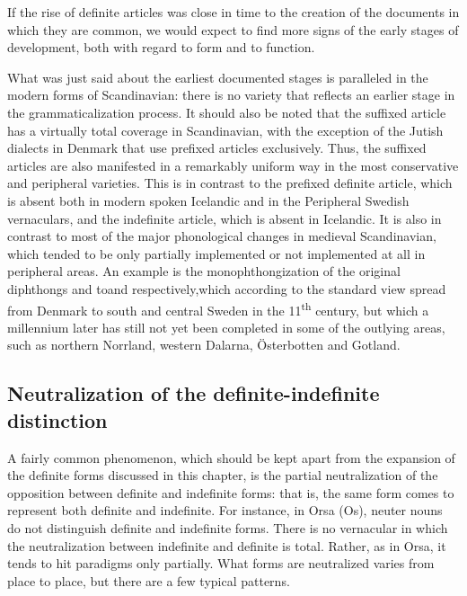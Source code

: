 \z

If the rise of definite articles was close in time to the creation of the documents in which they are common, we would expect to find more signs of the early stages of development, both with regard to form and to function.


What was just said about the earliest documented stages is paralleled in the modern forms of Scandinavian: there is no variety that reflects an earlier stage in the grammaticalization process. It should also be noted that the suffixed article has a virtually total coverage in Scandinavian, with the exception of the Jutish dialects in Denmark that use prefixed articles exclusively. Thus, the suffixed articles are also manifested in a remarkably uniform way in the most conservative and peripheral varieties. This is in contrast to the prefixed definite article, which is absent both in modern spoken Icelandic and in the Peripheral Swedish vernaculars, and the indefinite article, which is absent in Icelandic. It is also in contrast to most of the major phonological changes in medieval Scandinavian, which tended to be only partially implemented or not implemented at all in peripheral areas. An example is the monophthongization of the original diphthongs  and toand respectively,\textstyleLinguisticExample{ }which according to the standard view spread from Denmark to south and central Sweden in the 11\textsuperscript{th} century, but which a millennium later has still not yet been completed in some of the outlying areas, such as northern Norrland, western Dalarna, Österbotten and Gotland.  


\subsection{ Neutralization of the definite-indefinite distinction}
\label{bkm:Ref114304507}
A fairly common phenomenon, which should be kept apart from the expansion of the definite forms discussed in this chapter, is the partial neutralization of the opposition between definite and indefinite forms: that is, the same form comes to represent both definite and indefinite. For instance, in Orsa (Os), neuter nouns do not distinguish definite and indefinite forms. There is no vernacular in which the neutralization between indefinite and definite is total. Rather, as in Orsa, it tends to hit paradigms only partially. What forms are neutralized varies from place to place, but there are a few typical patterns.

